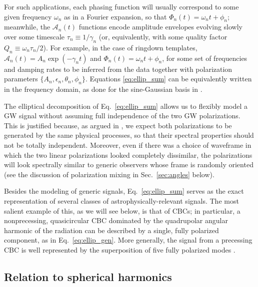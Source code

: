 \documentclass[aps,prd,twocolumn,superscriptaddress,preprintnumbers,floatfix,nofootinbib]{revtex4-2}
\newcommand*{\eq}[1]{Eq.~\eqref{eq:#1}}
\begin{document}
For such applications, each phasing function will usually correspond to some given frequency $\omega_n$ as in a Fourier expansion, so that $\Phi_n(t) = \omega_n t + \phi_n$; meanwhile, the $\mathcal{A}_n(t)$ functions encode amplitude envelopes evolving slowly over some timescale $\tau_n \equiv 1/\gamma_n$ (or, equivalently, with some quality factor $Q_n \equiv \omega_n \tau_n/2$).
For example, in the case of ringdown templates, $\mathcal{A}_n(t) = A_n \exp(-\gamma_n t)$ and $\Phi_n(t) = \omega_n t + \phi_n$, for some set of frequencies and damping rates to be inferred from the data together with polarization parameters $\{ A_n, \epsilon_n, \theta_n, \phi_n\}$.
Equations \eqref{eq:ellip_sum} can be equivalently written in the frequency domain, as done for the sine-Gaussian basis in \cite{Cornish:2014kda,Cornish:2020dwh}.

The elliptical decomposition of Eq.~\eqref{eq:ellip_sum} allows us to flexibly model a GW signal without assuming full independence of the two GW polarizations.
This is justified because, as argued in \cite{Chatziioannou:2021mij}, we expect both polarizations to be generated by the same physical processes, so that their spectral properties should not be totally independent.
Moreover, even if there was a choice of waveframe in which the two linear polarizations looked completely dissimilar, the polarizations will look spectrally similar to generic observers whose frame is randomly oriented (see the discussion of polarization mixing in Sec.~\ref{sec:angles} below).

Besides the modeling of generic signals, \eq{ellip_sum} serves as the exact representation of several classes of astrophysically-relevant signals.
The most salient example of this, as we will see below, is that of CBCs; in particular, a nonprecessing, quasicircular CBC dominated by the quadrupolar angular harmonic of the radiation can be described by a single, fully polarized component, as in \eq{ellip_gen}.
More generally, the signal from a precessing CBC is well represented by the superposition of five fully polarized modes \cite{Fairhurst:2019vut}.

\subsection{Relation to spherical harmonics}
\label{sec:harmonics}
\end{document}
